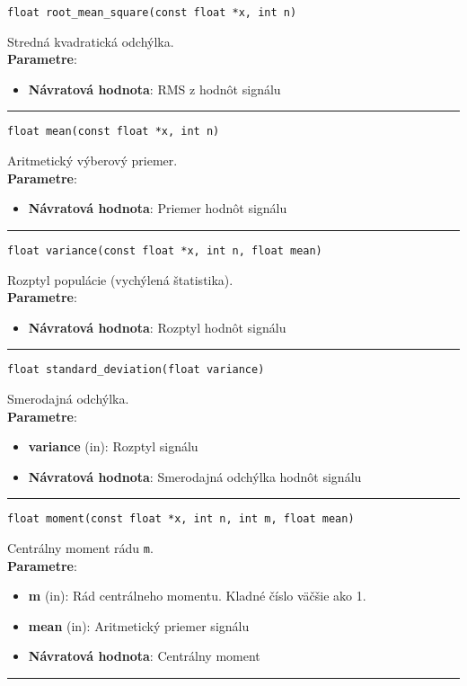 \begin{lstlisting}[style=docs]
float root_mean_square(const float *x, int n)
\end{lstlisting}
Stredná kvadratická odchýlka. \\ 
\textbf{Parametre}:
\begin{itemize}[noitemsep, topsep=0pt]
	\item \textbf{Návratová hodnota}:  RMS z hodnôt signálu
\end{itemize}
\bigbreak
\hrule

\begin{lstlisting}[style=docs]
float mean(const float *x, int n)
\end{lstlisting}
Aritmetický výberový priemer. \\ 
\textbf{Parametre}:
\begin{itemize}[noitemsep, topsep=0pt]
	\item \textbf{Návratová hodnota}:  Priemer hodnôt signálu
\end{itemize}
\bigbreak
\hrule

\begin{lstlisting}[style=docs]
float variance(const float *x, int n, float mean)
\end{lstlisting}
Rozptyl populácie (vychýlená štatistika). \\ 
\textbf{Parametre}:
\begin{itemize}[noitemsep, topsep=0pt]
	\item \textbf{Návratová hodnota}:  Rozptyl hodnôt signálu
\end{itemize}
\bigbreak
\hrule

\begin{lstlisting}[style=docs]
float standard_deviation(float variance)
\end{lstlisting}
Smerodajná odchýlka. \\ 
\textbf{Parametre}:
\begin{itemize}[noitemsep, topsep=0pt]
	\item \textbf{variance} (in): Rozptyl signálu
	\item \textbf{Návratová hodnota}:  Smerodajná odchýlka hodnôt signálu
\end{itemize}
\bigbreak
\hrule

\begin{lstlisting}[style=docs]
float moment(const float *x, int n, int m, float mean)
\end{lstlisting}
Centrálny moment rádu \verb|m|. \\ 
\textbf{Parametre}:
\begin{itemize}[noitemsep, topsep=0pt]
	\item \textbf{m} (in): Rád centrálneho momentu. Kladné číslo väčšie ako 1.
	\item \textbf{mean} (in): Aritmetický priemer signálu
	\item \textbf{Návratová hodnota}:  Centrálny moment
\end{itemize}
\bigbreak
\hrule

